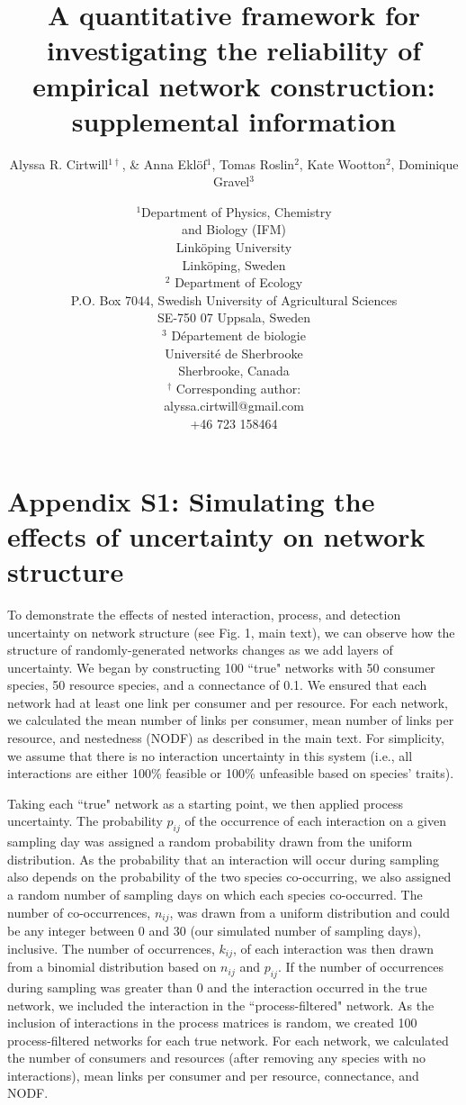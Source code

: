 \documentclass[12pt]{article}
\title{A quantitative framework for investigating the reliability of empirical network construction: supplemental information}
\author{Alyssa R. Cirtwill$^{1\dagger}$, \&  Anna Ekl\"{o}f$^{1}$, Tomas Roslin$^{2}$, Kate Wootton$^{2}$, Dominique Gravel$^{3}$}
\date{\small$^1$Department of Physics, Chemistry\\ 
and Biology (IFM)\\ 
Link\"{o}ping University\\
Link\"{o}ping, Sweden\\
\medskip $^2$ Department of Ecology\\ P.O. Box 7044, Swedish University of Agricultural Sciences \\ SE-750 07 Uppsala, Sweden \\
\medskip$^3$ D\'{e}partement de biologie\\ 
Universit\'{e} de Sherbrooke\\ 
Sherbrooke, Canada\\ 
\medskip
$^\dagger$ Corresponding author:\\
alyssa.cirtwill@gmail.com\\
+46 723 158464\\
}
\begin{document}
 
\maketitle 
\raggedright
\setlength{\parindent}{15pt} 
\clearpage

\linenumbers

\section*{Appendix S1: Simulating the effects of uncertainty on network structure}

  To demonstrate the effects of nested interaction, process, and detection uncertainty on network structure (see Fig. 1, main text), we can observe how the structure of randomly-generated networks changes as we add layers of uncertainty. We began by constructing 100 ``true" networks with 50 consumer species, 50 resource species, and a connectance of 0.1. We ensured that each network had at least one link per consumer and per resource. For each network, we calculated the mean number of links per consumer, mean number of links per resource, and nestedness (NODF) as described in the main text. For simplicity, we assume that there is no interaction uncertainty in this system (i.e., all interactions are either 100\% feasible or 100\% unfeasible based on species' traits).


  Taking each ``true" network as a starting point, we then applied process uncertainty. The probability $p_{ij}$ of the occurrence of each interaction on a given sampling day was assigned a random probability drawn from the uniform distribution. As the probability that an interaction will occur during sampling also depends on the probability of the two species co-occurring, we also assigned a random number of sampling days on which each species co-occurred. The number of co-occurrences, $n_{ij}$, was drawn from a uniform distribution and could be any integer between 0 and 30 (our simulated number of sampling days), inclusive. The number of occurrences, $k_{ij}$, of each interaction was then drawn from a binomial distribution based on $n_{ij}$ and $p_{ij}$. If the number of occurrences during sampling was greater than 0 and the interaction occurred in the true network, we included the interaction in the ``process-filtered" network. As the inclusion of interactions in the process matrices is random, we created 100 process-filtered networks for each true network. For each network, we calculated the number of consumers and resources (after removing any species with no interactions), mean links per consumer and per resource, connectance, and NODF.
\end{document}
